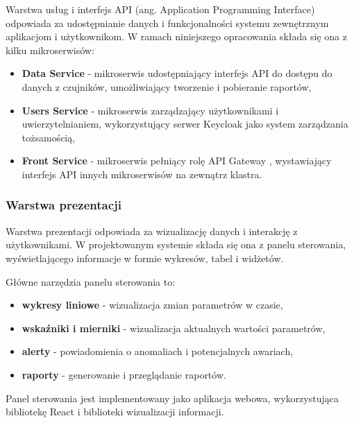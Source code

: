 Warstwa usług i interfejs API (ang. Application Programming Interface) odpowiada za udostępnianie danych i funkcjonalności systemu zewnętrznym aplikacjom i użytkownikom. W ramach niniejszego opracowania składa się ona z kilku mikroserwisów:

\begin{itemize}
    \item \textbf{Data Service} - mikroserwis udostępniający interfejs API do dostępu do danych z czujników, umożliwiający tworzenie i pobieranie raportów,
    \item \textbf{Users Service} - mikroserwis zarządzający użytkownikami i uwierzytelnianiem, wykorzystujący serwer Keycloak jako system zarządzania tożsamością,
    \item \textbf{Front Service} - mikroserwis pełniący rolę API Gateway \cite{api_gateway_definition}, wystawiający interfejs API innych mikroserwisów na zewnątrz klastra.
\end{itemize}


\subsubsection{Warstwa prezentacji}
\label{subsubsec:warstwa_prezentacji}

Warstwa prezentacji odpowiada za wizualizację danych i interakcję z użytkownikami.
W projektowanym systemie składa się ona z panelu sterowania, wyświetlającego informacje w formie wykresów, tabel i widżetów.

\vspace{0.3em}

Główne narzędzia panelu sterowania to:

\begin{itemize}
    \item \textbf{wykresy liniowe} - wizualizacja zmian parametrów w czasie,
    \item \textbf{wskaźniki i mierniki} - wizualizacja aktualnych wartości parametrów,
    \item \textbf{alerty} - powiadomienia o anomaliach i potencjalnych awariach,
    \item \textbf{raporty} - generowanie i przeglądanie raportów.
\end{itemize}

Panel sterowania jest implementowany jako aplikacja webowa, wykorzystująca bibliotekę React i biblioteki wizualizacji informacji.

